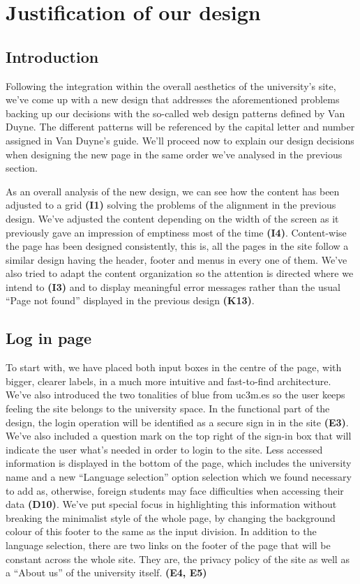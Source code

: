 \documentclass{article}
\begin{document}
\newpage



\section{Justification of our design}
\subsection{Introduction}
Following the integration within the overall aesthetics of the university’s site, we’ve come up with a new design that addresses the aforementioned problems backing up our decisions with the so-called web design patterns defined by Van Duyne. The different patterns will be referenced by the capital letter and number assigned in Van Duyne’s guide.
We’ll proceed now to explain our design decisions when designing the new page in the same order we’ve analysed in the previous section.

As an overall analysis of the new design, we can see how the content has been adjusted to a grid \textbf{(I1)} solving the problems of the alignment in the previous design. We’ve adjusted the content depending on the width of the screen as it previously gave an impression of emptiness most of the time \textbf{(I4)}. Content-wise the page has been designed consistently, this is, all the pages in the site follow a similar design having the header, footer and menus in every one of them. We’ve also tried to adapt the content organization so the attention is directed where we intend to \textbf{(I3)} and to display meaningful error messages rather than the usual “Page not found” displayed in the previous design \textbf{(K13)}.
\subsection{Log in page}

To start with, we have placed both input boxes in the centre of the page, with bigger, clearer labels, in a much more intuitive and fast-to-find architecture. We’ve also introduced the two tonalities of blue from uc3m.es so the user keeps feeling the site belongs to the university space. In the functional part of the design, the login operation will be identified as a secure sign in in the site \textbf{(E3)}. We’ve also included a question mark on the top right of the sign-in box that will indicate the user what’s needed in order to login to the site.
Less accessed information is displayed in the bottom of the page, which includes the university name and a new “Language selection” option selection which we found necessary to add as, otherwise, foreign students may face difficulties when accessing their data \textbf{(D10)}. We’ve put special focus in highlighting this information without breaking the minimalist style of the whole page, by changing the background colour of this footer to the same as the input division. In addition to the language selection, there are two links on the footer of the page that will be constant across the whole site. They are, the privacy policy of the site as well as a “About us” of the university itself. \textbf{(E4, E5)}
\end{document}
